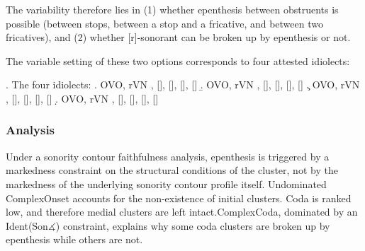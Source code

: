 \documentclass[12pt]{article}
\newcommand{\tickYes}{\checkmark}
\newcommand{\tickNo}{\hspace{1pt}\ding{55}}
\begin{document}
The variability therefore lies in (1) whether epenthesis between obstruents is possible (between stops, between a stop and a fricative, and between two fricatives), and (2) whether [r]-sonorant can be broken up by epenthesis or not.

The variable setting of these two options corresponds to four attested idiolects:

  \ex. \label{idiolects} The four idiolects: \citep[(43)]{rose.2000}
       \a. \label{idiolecta} \tickYes OVO, \tickNo rVN \newline %
           [\textipa{k1rm}], [], [], [], []
       \b. \label{idiolectb} \tickYes OVO, \tickYes rVN \newline %
           [\textipa{k1r1m}], [], [], [], []
       \c. \label{idiolectc} \tickNo OVO, \tickNo rVN \newline %
           [\textipa{k1rm}], [], [], [], []
       \d. \label{idiolectd} \tickNo OVO, \tickYes rVN \newline %
           [\textipa{k1r1m}], [], [], [], []


\subsubsection{Analysis}

Under a sonority contour faithfulness analysis, epenthesis is triggered by a markedness constraint on the structural conditions of the cluster, not by the markedness of the underlying sonority contour profile itself. Undominated {\sc *ComplexOnset} accounts for the non-existence of initial clusters. {\sc *Coda} is ranked low, and therefore medial clusters are left intact.{\sc *ComplexCoda}, dominated by an {\sc Ident(Son$\measuredangle$)} constraint, explains why some coda clusters are broken up by epenthesis while others are not.
\end{document}
